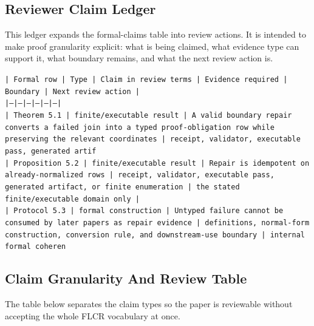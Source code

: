 \documentclass[11pt]{article}
\begin{document}
\subsection*{Reviewer Claim Ledger}

This ledger expands the formal-claims table into review actions. It is intended to make proof granularity explicit: what is being claimed, what evidence type can support it, what boundary remains, and what the next review action is.

\noindent\texttt{| Formal row | Type | Claim in review terms | Evidence required | Boundary | Next review action |}\\
\noindent\texttt{|---|---|---|---|---|---|}\\
\noindent\texttt{| Theorem 5.1 | finite/executable result | A valid boundary repair converts a failed join into a typed proof-obligation row while preserving the relevant coordinates | receipt, validator, executable pass, generated artif}\\
\noindent\texttt{| Proposition 5.2 | finite/executable result | Repair is idempotent on already-normalized rows | receipt, validator, executable pass, generated artifact, or finite enumeration | the stated finite/executable domain only |}\\
\noindent\texttt{| Protocol 5.3 | formal construction | Untyped failure cannot be consumed by later papers as repair evidence | definitions, normal-form construction, conversion rule, and downstream-use boundary | internal formal coheren}\\

\subsection*{Claim Granularity And Review Table}

The table below separates the claim types so the paper is reviewable without accepting the whole FLCR vocabulary at once.
\end{document}
